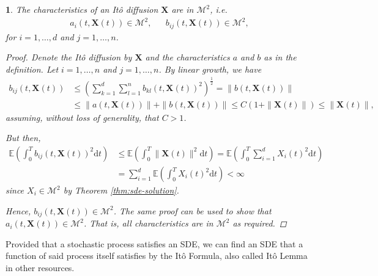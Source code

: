 \documentclass[english]{article}
\numberwithin{equation}{section}
\numberwithin{figure}{section}
\theoremstyle{bolddescit}
\theoremstyle{definition}
\theoremstyle{definition}
\theoremstyle{plain}
\newtheorem{lemma}[theorem]{\protect\lemmaname}
\theoremstyle{plain}
\theoremstyle{bolddesc}
\theoremstyle{plain}
\theoremstyle{remark}
\providecommand{\lemmaname}{Lemma}
\begin{document}
\begin{lemma}\label{lem:ito-diffusion-characteristics-m2}
  The characteristics of an It\^o diffusion $\mathbf{X}$ are in $\mathcal{M}^2$, i.e.
  \begin{align*}
    a_i(t,\mathbf{X}(t)) \in \mathcal{M}^2, &&
    b_{ij}(t,\mathbf{X}(t)) \in \mathcal{M}^2,
  \end{align*}
  for $i=1,\ldots,d$ and $j=1,\ldots,n$.

  \begin{proof}
    Denote the It\^o diffusion by $\mathbf{X}$ and the characteristics $a$ and $b$ as in the definition. Let $i=1,\ldots,n$ and $j=1,\ldots,n$. By linear growth, we have
    \begin{align*}
      b_{ij}(t,\mathbf{X}(t))
      &\le \left( \sum_{k=1}^d \sum_{l=1}^n b_{kl}(t,\mathbf{X}(t))^2 \right)^{\frac{1}{2}}
      = \|b(t,\mathbf{X}(t))\|\\
      &\le \|a(t,\mathbf{X}(t))\| + \|b(t,\mathbf{X}(t))\|
      \le C (1 + \|\mathbf{X}(t)\|)
      \le \|\mathbf{X}(t)\|,
    \end{align*}
    assuming, without loss of generality, that $C > 1$.

    But then,
    \begin{align*}
      \mathbb{E} \left( \int_0^T b_{ij}(t,\mathbf{X}(t))^2 \mathrm{d}t \right)
      &\le \mathbb{E} \left( \int_0^T \|\mathbf{X}(t)\|^2 \mathrm{d}t \right)
      = \mathbb{E} \left( \int_0^T \sum_{i=1}^d X_i(t)^2 \mathrm{d}t \right)\\
      &= \sum_{i=1}^d \mathbb{E} \left( \int_0^T X_i(t)^2 \mathrm{d}t \right) < \infty \tag{linearity}
    \end{align*}
    since $X_i \in \mathcal{M}^2$ by Theorem \ref{thm:sde-solution}.

    Hence, $b_{ij}(t,\mathbf{X}(t)) \in \mathcal{M}^2$. The same proof can be used to show that $a_i(t,\mathbf{X}(t)) \in \mathcal{M}^2$. That is, all characteristics are in $\mathcal{M}^2$ as required.
  \end{proof}
\end{lemma}

Provided that a stochastic process satisfies an SDE, we can find an SDE that a function of said process itself satisfies by the It\^o Formula, also called It\^o Lemma in other resources.
\end{document}
